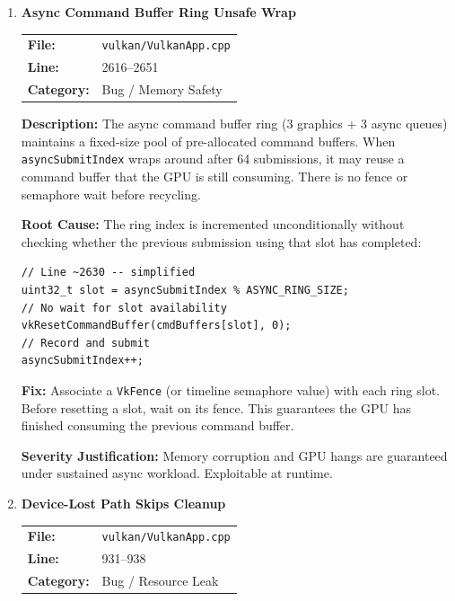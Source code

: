 \documentclass[a4paper,12pt]{article}
\newcommand{\severitybox}[2]{%
  \colorbox{#1}{\makebox[2.5cm][c]{\textcolor{white}{\textbf{#2}}}}%
}
\begin{document}
\begin{enumerate}[leftmargin=*]

\item[\textbf{[B1]}] \textbf{Async Command Buffer Ring Unsafe Wrap}
  \hfill \severitybox{criticalcolor}{CRITICAL}

  \begin{tabular}{ll}
    \textbf{File:} & \texttt{vulkan/VulkanApp.cpp} \\
    \textbf{Line:} & 2616--2651 \\
    \textbf{Category:} & Bug / Memory Safety \\
  \end{tabular}

  \textbf{Description:}
  The async command buffer ring (3 graphics + 3 async queues) maintains a fixed-size pool of
  pre-allocated command buffers. When \texttt{asyncSubmitIndex} wraps around after 64
  submissions, it may reuse a command buffer that the GPU is still consuming. There is no
  fence or semaphore wait before recycling.

  \textbf{Root Cause:}
  The ring index is incremented unconditionally without checking whether the previous
  submission using that slot has completed:

\begin{lstlisting}
// Line ~2630 -- simplified
uint32_t slot = asyncSubmitIndex % ASYNC_RING_SIZE;
// No wait for slot availability
vkResetCommandBuffer(cmdBuffers[slot], 0);
// Record and submit
asyncSubmitIndex++;
\end{lstlisting}

  \textbf{Fix:}
  Associate a \texttt{VkFence} (or timeline semaphore value) with each ring slot.
  Before resetting a slot, wait on its fence. This guarantees the GPU has finished
  consuming the previous command buffer.

  \textbf{Severity Justification:} Memory corruption and GPU hangs are guaranteed
  under sustained async workload. Exploitable at runtime.

\item[\textbf{[B2]}] \textbf{Device-Lost Path Skips Cleanup}
  \hfill \severitybox{criticalcolor}{CRITICAL}

  \begin{tabular}{ll}
    \textbf{File:} & \texttt{vulkan/VulkanApp.cpp} \\
    \textbf{Line:} & 931--938 \\
    \textbf{Category:} & Bug / Resource Leak \\
  \end{tabular}


\end{enumerate}
\end{document}
